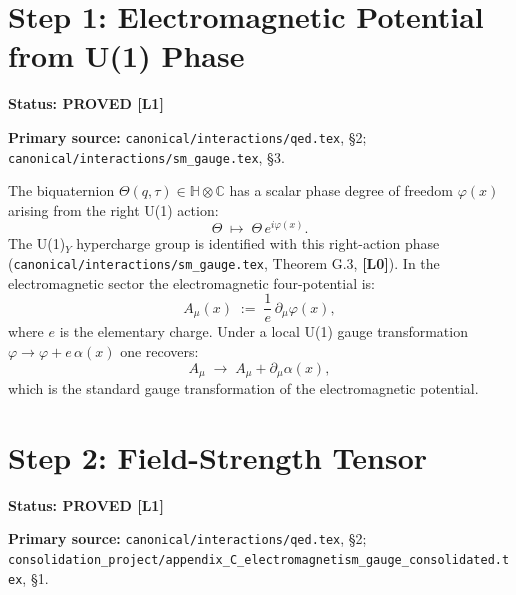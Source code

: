 \documentclass[11pt,a4paper]{article}
\newcommand{\Lzero}{\textbf{[L0]}}
\newcommand{\Lone}{\textbf{[L1]}}
\newcommand{\PROVED}{\textbf{PROVED}}
\begin{document}
\section{Step 1: Electromagnetic Potential from U(1) Phase}

\noindent\textbf{Status: \PROVED{} \Lone}

\noindent\textbf{Primary source:}
\texttt{canonical/interactions/qed.tex}, \S2;
\texttt{canonical/interactions/sm\_gauge.tex}, \S3.

\medskip

The biquaternion $\Theta(q,\tau) \in \mathbb{H} \otimes \mathbb{C}$ has a scalar
phase degree of freedom $\varphi(x)$ arising from the right U(1) action:
\begin{equation}
  \Theta \;\mapsto\; \Theta\,e^{i\varphi(x)}.
\end{equation}
The U(1)$_Y$ hypercharge group is identified with this right-action phase
(\texttt{canonical/interactions/sm\_gauge.tex}, Theorem G.3, \Lzero).
In the electromagnetic sector the electromagnetic four-potential is:
\begin{equation}\label{eq:potential}
  A_\mu(x) \;:=\; \frac{1}{e}\,\partial_\mu \varphi(x),
\end{equation}
where $e$ is the elementary charge. Under a local U(1) gauge transformation
$\varphi \to \varphi + e\,\alpha(x)$ one recovers:
\begin{equation}
  A_\mu \;\to\; A_\mu + \partial_\mu \alpha(x),
\end{equation}
which is the standard gauge transformation of the electromagnetic potential.

\section{Step 2: Field-Strength Tensor}

\noindent\textbf{Status: \PROVED{} \Lone}

\noindent\textbf{Primary source:}
\texttt{canonical/interactions/qed.tex}, \S2;
\texttt{consolidation\_project/appendix\_C\_electromagnetism\_gauge\_consolidated.tex}, \S1.

\medskip
\end{document}
